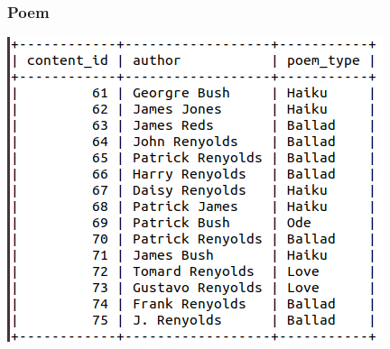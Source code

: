 \documentclass[letter, 12pt, titlepage]{article}
\begin{document}
\subsubsection{Poem}
\includegraphics[scale=.45]{poem.png}
\end{document}
